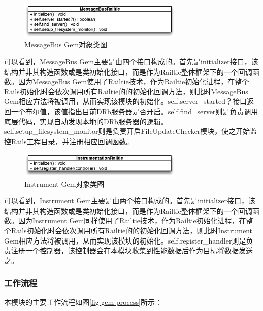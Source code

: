 \begin{figure}[h]
\centering
\includegraphics[width=0.7\textwidth]{images/detail/autoload_class.eps}
\caption{MessageBus Gem对象类图}
\label{fig-autoload-class}
\end{figure}

可以看到，MessageBus Gem主要是由四个接口构成的。首先是initializer接口，该结构并非其构造函数或是类初始化接口，而是作为Railtie整体框架下的一个回调函数。因为MessageBus Gem使用了Railtie技术，作为Railtie初始化进程，在整个Rails初始化时会依次调用所有Railtie的的初始化回调方法，则此时MessageBus Gem相应方法将被调用，从而实现该模块的初始化。self.server\_started？接口返回一个布尔值，该值指出目前DRb服务器是否开启。self.find\_server则是负责调用底层代码，实现自动发现本地的DRb服务器的逻辑。self.setup\_filesystem\_monitor则是负责开启FileUpdateChecker模块，使之开始监控Rails工程目录，并注册相应回调函数。

\begin{figure}[h]
\centering
\includegraphics[width=0.7\textwidth]{images/detail/instrument_class.eps}
\caption{Instrument Gem对象类图}
\label{fig-instrument-class}
\end{figure}

可以看到，Instrument Gem主要是由两个接口构成的。首先是initializer接口，该结构并非其构造函数或是类初始化接口，而是作为Railtie整体框架下的一个回调函数。因为Instrument Gem同样使用了Railtie技术，作为Railtie初始化进程，在整个Rails初始化时会依次调用所有Railtie的的初始化回调方法，则此时Instrument Gem相应方法将被调用，从而实现该模块的初始化。self.register\_handler则是负责注册一个控制器，该控制器会在本模块收集到性能数据后作为目标将数据发送之。

\subsubsection{工作流程}
本模块的主要工作流程如图\ref{fig-gem-process}所示：

